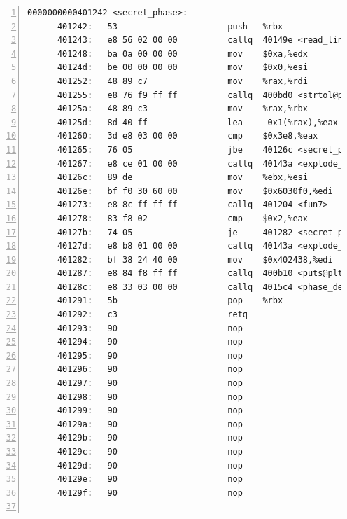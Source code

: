 \documentclass{article}
\begin{document}
\begin{lstlisting}[title = bomb的反汇编代码及部分注释, xleftmargin = 2em,xrightmargin = 2em, aboveskip = 1em, numbers = left, basicstyle=\scriptsize\ttfamily, numberstyle=\scriptsize]
    0000000000401242 <secret_phase>:
      401242:	53                   	push   %rbx
      401243:	e8 56 02 00 00       	callq  40149e <read_line>			; read_line(...);
      401248:	ba 0a 00 00 00       	mov    $0xa,%edx					; %edx = 0xa;
      40124d:	be 00 00 00 00       	mov    $0x0,%esi					; %esi = 0x0;
      401252:	48 89 c7             	mov    %rax,%rdi					; %rdi = %rax;
      401255:	e8 76 f9 ff ff       	callq  400bd0 <strtol@plt>			; strtol(...);
      40125a:	48 89 c3             	mov    %rax,%rbx					; %rbx = %rax;
      40125d:	8d 40 ff             	lea    -0x1(%rax),%eax				; %eax--;
      401260:	3d e8 03 00 00       	cmp    $0x3e8,%eax					; if (%eax <= 0x3e8)
      401265:	76 05                	jbe    40126c <secret_phase+0x2a>	;	  goto #634;
      401267:	e8 ce 01 00 00       	callq  40143a <explode_bomb>		; explode_bomb(...);
      40126c:	89 de                	mov    %ebx,%esi					; %esi = %ebx;
      40126e:	bf f0 30 60 00       	mov    $0x6030f0,%edi				; %edi = 0x6030f0;
      401273:	e8 8c ff ff ff       	callq  401204 <fun7>				; fun7(%rdi, %rsi);
      401278:	83 f8 02             	cmp    $0x2,%eax					; if (%eax == 2)
      40127b:	74 05                	je     401282 <secret_phase+0x40>	;	  goto #640;
      40127d:	e8 b8 01 00 00       	callq  40143a <explode_bomb>		; explode_bomb(...);
      401282:	bf 38 24 40 00       	mov    $0x402438,%edi				; %edi = 0x402438;
      401287:	e8 84 f8 ff ff       	callq  400b10 <puts@plt>			; puts(%rdi);
      40128c:	e8 33 03 00 00       	callq  4015c4 <phase_defused>		; phase_defused(...);
      401291:	5b                   	pop    %rbx
      401292:	c3                   	retq   
      401293:	90                   	nop
      401294:	90                   	nop
      401295:	90                   	nop
      401296:	90                   	nop
      401297:	90                   	nop
      401298:	90                   	nop
      401299:	90                   	nop
      40129a:	90                   	nop
      40129b:	90                   	nop
      40129c:	90                   	nop
      40129d:	90                   	nop
      40129e:	90                   	nop
      40129f:	90                   	nop
    

\end{lstlisting}
\end{document}
